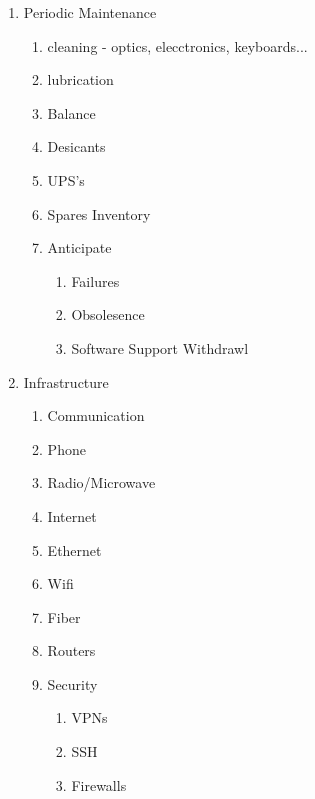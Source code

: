 \documentclass[letter,11pt,oneside]{article}
\begin{document}
\vspace{-.15cm}
\begin{enumerate}\addtolength{\itemsep}{-0.5\baselineskip}
   \item   Periodic Maintenance
\vspace{-.15cm}
\begin{enumerate}\addtolength{\itemsep}{-0.5\baselineskip}
   \item     cleaning - optics, elecctronics, keyboards...
   \item     lubrication
   \item     Balance
   \item     Desicants
   \item     UPS's
   \item     Spares Inventory
   \item     Anticipate
\vspace{-.15cm}
\begin{enumerate}\addtolength{\itemsep}{-0.5\baselineskip}
   \item        Failures
   \item        Obsolesence
   \item        Software Support Withdrawl
\end{enumerate}
\end{enumerate}


   \item   Infrastructure
\vspace{-.15cm}
\begin{enumerate}\addtolength{\itemsep}{-0.5\baselineskip}
   \item      Communication
   \item      Phone
   \item      Radio/Microwave
   \item      Internet
   \item         Ethernet
   \item         Wifi
   \item         Fiber
   \item         Routers
   \item         Security
\vspace{-.15cm}
\begin{enumerate}\addtolength{\itemsep}{-0.5\baselineskip}
   \item            VPNs
   \item            SSH
   \item            Firewalls
\end{enumerate}


\end{enumerate}
\end{enumerate}
\end{document}
